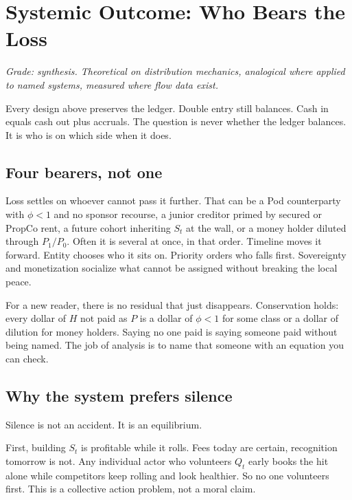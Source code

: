 \documentclass[11pt]{article}
\begin{document}
\section{Systemic Outcome: Who Bears the Loss}
\label{sec:systemic}

\textit{Grade: synthesis. Theoretical on distribution mechanics, analogical where applied to named systems, measured where flow data exist.}

Every design above preserves the ledger. Double entry still balances. Cash in equals cash out plus accruals. The question is never whether the ledger balances. It is who is on which side when it does.

\subsection{Four bearers, not one}

Loss settles on whoever cannot pass it further. That can be a Pod counterparty with $\phi<1$ and no sponsor recourse, a junior creditor primed by secured or PropCo rent, a future cohort inheriting $S_t$ at the wall, or a money holder diluted through $P_1/P_0$. Often it is several at once, in that order. Timeline moves it forward. Entity chooses who it sits on. Priority orders who falls first. Sovereignty and monetization socialize what cannot be assigned without breaking the local peace.

For a new reader, there is no residual that just disappears. Conservation holds: every dollar of $H$ not paid as $P$ is a dollar of $\phi<1$ for some class or a dollar of dilution for money holders. Saying no one paid is saying someone paid without being named. The job of analysis is to name that someone with an equation you can check.

\subsection{Why the system prefers silence}

Silence is not an accident. It is an equilibrium.

First, building $S_t$ is profitable while it rolls. Fees today are certain, recognition tomorrow is not. Any individual actor who volunteers $Q_t$ early books the hit alone while competitors keep rolling and look healthier. So no one volunteers first. This is a collective action problem, not a moral claim.
\end{document}
